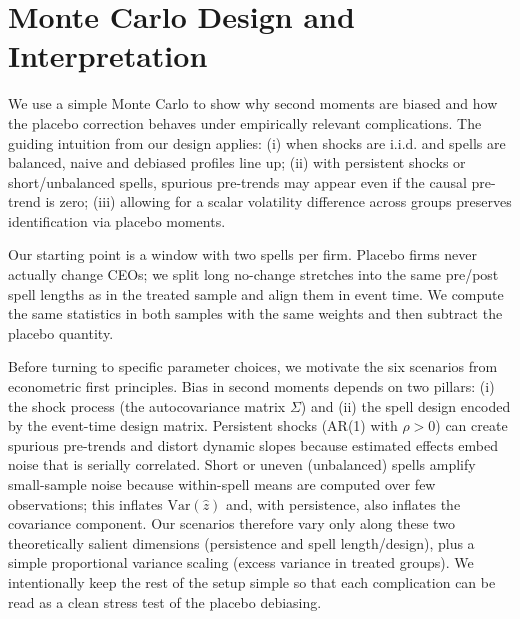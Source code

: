 \documentclass[11pt,a4paper]{article}
\newcommand{\Var}{\text{Var}}
\begin{document}
\section{Monte Carlo Design and Interpretation}

We use a simple Monte Carlo to show why second moments are biased and how the placebo correction behaves under empirically relevant complications. The guiding intuition from our design applies: (i) when shocks are i.i.d. and spells are balanced, naive and debiased profiles line up; (ii) with persistent shocks or short/unbalanced spells, spurious pre-trends may appear even if the causal pre-trend is zero; (iii) allowing for a scalar volatility difference across groups preserves identification via placebo moments.

Our starting point is a window with two spells per firm. Placebo firms never actually change CEOs; we split long no-change stretches into the same pre/post spell lengths as in the treated sample and align them in event time. We compute the same statistics in both samples with the same weights and then subtract the placebo quantity. 

Before turning to specific parameter choices, we motivate the six scenarios from econometric first principles. Bias in second moments depends on two pillars: (i) the shock process (the autocovariance matrix \(\Sigma\)) and (ii) the spell design encoded by the event-time design matrix. Persistent shocks (AR(1) with \(\rho>0\)) can create spurious pre-trends and distort dynamic slopes because estimated effects embed noise that is serially correlated. Short or uneven (unbalanced) spells amplify small-sample noise because within-spell means are computed over few observations; this inflates \(\Var(\hat z)\) and, with persistence, also inflates the covariance component. Our scenarios therefore vary only along these two theoretically salient dimensions (persistence and spell length/design), plus a simple proportional variance scaling (excess variance in treated groups). We intentionally keep the rest of the setup simple so that each complication can be read as a clean stress test of the placebo debiasing.
\end{document}
